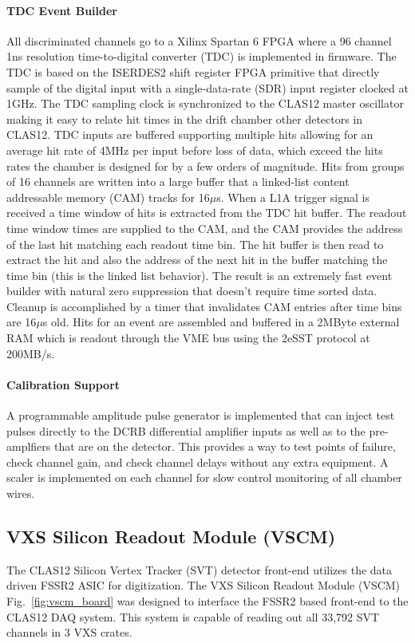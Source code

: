 \paragraph{TDC Event Builder}
All discriminated channels go to a Xilinx Spartan 6 FPGA where a 96 channel 1ns resolution time-to-digital converter (TDC) is implemented in firmware. The TDC is based on the ISERDES2 shift register FPGA primitive that directly sample of the digital input with a single-data-rate (SDR) input register clocked at 1GHz. The TDC sampling clock is synchronized to the CLAS12 master oscillator making it easy to relate hit times in the drift chamber other detectors in CLAS12. TDC inputs are buffered supporting multiple hits allowing for an average hit rate of 4MHz per input before loss of data, which exceed the hits rates the chamber is designed for by a few orders of magnitude. Hits from groups of 16 channels are written into a large buffer that a linked-list content addressable memory (CAM) tracks for 16$\mu$s. When a L1A trigger signal is received a time window of hits is extracted from the TDC hit buffer. The readout time window times are supplied to the CAM, and the CAM provides the address of the last hit matching each readout time bin. The hit buffer is then read to extract the hit and also the address of the next hit in the buffer matching the time bin (this is the linked list behavior). The result is an extremely fast event builder with natural zero suppression that doesn't require time sorted data. Cleanup is accomplished by a timer that invalidates CAM entries after time bins are 16$\mu$s old. Hits for an event are assembled and buffered in a 2MByte external RAM which is readout through the VME bus using the 2eSST protocol at 200MB/s.

\paragraph{Calibration Support}
A programmable amplitude pulse generator is implemented that can inject test pulses directly to the DCRB differential amplifier inputs as well as to the pre-amplfiers that are on the detector. This provides a way to test points of failure, check channel gain, and check channel delays without any extra equipment. A scaler is implemented on each channel for slow control monitoring of all chamber wires.

\subsection{VXS Silicon Readout Module (VSCM)}
The CLAS12 Silicon Vertex Tracker (SVT) detector front-end utilizes the data driven FSSR2 ASIC for digitization. The VXS Silicon Readout Module (VSCM) Fig.~\ref{fig:vscm_board} was designed to interface the FSSR2 based front-end to the CLAS12 DAQ system. This system is capable of reading out all 33,792 SVT channels in 3 VXS crates.

